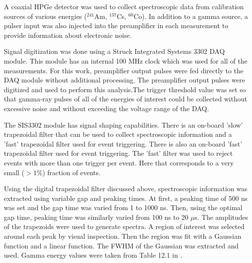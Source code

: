 A coaxial HPGe detector was used to collect spectroscopic data from calibration sources of various energies (${}^{241}$Am, ${}^{137}$Cs, ${}^{60}$Co). In addition to a gamma source, a pulser input was also injected into the preamplifier in each measurement to provide information about electronic noise. 

Signal digitization was done using a Struck Integrated Systems 3302 DAQ module. This module has an internal 100 MHz clock which was used for all of the measurements. For this work, preamplifier output pulses were fed directly to the DAQ module without additional processing. The preamplifier output pulses were digitized and used to perform this analysis.The trigger threshold value was set so that gamma-ray pulses of all of the energies of interest could be collected without excessive noise and without exceeding the voltage range of the DAQ.

The SIS3302 module has signal shaping capabilities. There is an on-board 'slow' trapezoidal filter that can be used to collect spectroscopic information and a 'fast' trapezoidal filter used for event triggering. There is also an on-board 'fast' trapezoidal filter used for event triggering. The 'fast' filter was used to reject events with more than one trigger per event. Here that corresponds to a very small ($>1\%$) fraction of events.

Using the digital trapezoidal filter discussed above, spectroscopic information was extracted using variable gap and peaking times. At first, a peaking time of 500 ns was set and the gap time was varied from 1 to 1000 ns. Then, using the optimal gap time, peaking time was similarly varied from 100 ns to 20 $\mu$s. The amplitudes of the trapezoids were used to generate spectra. A region of interest was selected around each peak by visual inspection. Then the region was fit with a Gaussian function and a linear function. The FWHM of the Gaussian was extracted and used. Gamma energy values were taken from Table 12.1 in \cite{Knoll} .